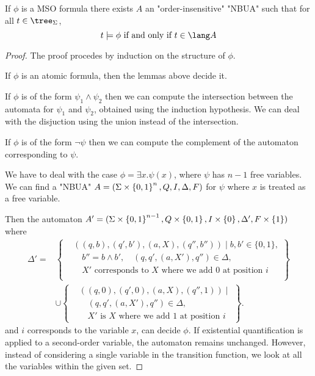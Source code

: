 \documentclass{article}
\begin{document}
\begin{lemma} \label{lem:MSO-aut}
	If $\phi$ is a MSO formula there exists $A$ an "order-insensitive" "NBUA" such that for all $t \in \tree_{\Sigma}$,
	\[ t \models \phi \tiff t \in \lang A \]
\end{lemma}


\begin{proof}
	The proof procedes by induction on the structure of $\phi$.

	If $\phi$ is an atomic formula, then the lemmas above decide it.

	If $\phi$ is of the form $\psi_1 \land \psi_2$ then we can compute the intersection between the automata
	for $\psi_1$ and $\psi_2$, obtained using the induction hypothesis. We can deal with the disjuction using the
	union instead of the intersection.

	If $\phi$ is of the form $\lnot \psi$ then we can compute the complement of the automaton corresponding to $\psi$.

	We have to deal with the case $\phi = \exists x.\psi(x)$, where $\psi$ has $n-1$ free variables. We can find a "NBUA" $A = (\Sigma \times \left\{0,1\right\}^n, Q, I, \Delta, F)$
	for $\psi$ where $x$ is treated as a free variable.

	Then the automaton $A' = (\Sigma \times \left\{0,1\right\}^{n-1}, Q \times \left\{0,1\right\}, I \times \left\{0\right\}, \Delta', F \times \left\{1\right\})$ where
	\[
		\begin{aligned}
			\Delta' = & \left\{
			\begin{aligned}
				 & ((q,b), (q', b'), (a, X), (q'',b'')) \mid b, b' \in \{0,1\},               \\
				 & \quad b'' = b \land b', \quad (q, q', (a, X'), q'') \in \Delta,            \\
				 & \quad X' \text{ corresponds to $X$ where we add } 0 \text{ at position } i \\
			\end{aligned}
			\right\}                 \\
			          & \cup \left\{
			\begin{aligned}
				 & ((q,0), (q', 0), (a, X), (q'',1)) \mid                         \\
				 & \quad (q, q', (a, X'), q'') \in \Delta,                        \\
				 & \quad X' \text{ is $X$ where we add } 1 \text{ at position } i
			\end{aligned}
			\right\}.
		\end{aligned}
	\]
	and $i$ corresponds to the variable $x$, can decide $\phi$. If existential quantification is applied to a
	second-order variable, the automaton remains unchanged. However, instead of considering a single variable
	in the transition function, we look at all the variables within the given set.
\end{proof}
\end{document}

